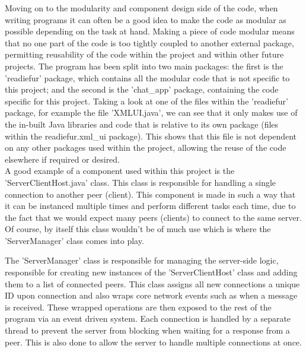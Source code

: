 \documentclass{COMPXXXX}
\begin{document}
\normalsize \textrm {Moving on to the modularity and component design side of the code, when writing programs it can often be a good idea to make the code as modular as possible depending on the task at hand. Making a piece of code modular means that no one part of the code is too tightly coupled to another external package, permitting  reusability of the code within the project and within other future projects.
The program has been split into two main packages: the first is the 'readiefur' package, which contains all the modular code that is not specific to this project; and the second is the 'chat\_app' package, containing the code specific for this project. Taking a look at one of the files within the 'readiefur' package, for example the file 'XMLUI.java', we can see that it only makes use of the in-built Java libraries and code that is relative to its own package (files within the readiefur.xml\_ui package). This shows that this file is not dependent on any other packages used within the project, allowing the reuse of the code elsewhere if required or desired.\\
A good example of a component used within this project is the 'ServerClientHost.java' class. This class is responsible for handling a single connection to another peer (client). This component is made in such a way that it can be instanced multiple times and perform different tasks each time, due to the fact that we would expect many peers (clients) to connect to the same server. Of course, by itself this class wouldn't be of much use which is where the 'ServerManager' class comes into play.}

\normalsize \textrm {The 'ServerManager' class is responsible for managing the server-side logic, responsible for creating new instances of the 'ServerClientHost' class and adding them to a list of connected peers. This class assigns all new connections a unique ID upon connection and also wraps core network events such as when a message is received. These wrapped operations are then exposed to the rest of the program via an event driven system. Each connection is handled by a separate thread to prevent the server from blocking when waiting for a response from a peer. This is also done to allow the server to handle multiple connections at once.}
\end{document}
